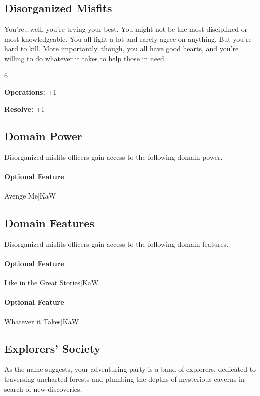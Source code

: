 \documentclass[10pt,a4paper,twoside,bg=print,twocolumn,openany,nodeprecatedcode]{dndbook}
\begin{document}
\subsection{Disorganized Misfits}
You're...well, you're trying your best. You might not be the most disciplined or most knowledgeable. You all fight a lot and rarely agree on anything. But you're hard to kill. More importantly, though, you all have good hearts, and you're willing to do whatever it takes to help those in need.

{\par \vspace { 9pt plus 3pt minus 3pt } \noindent  {} \nopagebreak }

\begin{itemize}
\begin{multicols}{6}
\item \textbf{Operations:} +1
\item \textbf{Resolve:} +1
\end{multicols}

\end{itemize}

\subsection{Domain Power}
Disorganized misfits officers gain access to the following domain power.

\paragraph{Optional Feature}
Avenge Me|KaW

\subsection{Domain Features}
Disorganized misfits officers gain access to the following domain features.

\paragraph{Optional Feature}
Like in the Great Stories|KaW

\paragraph{Optional Feature}
Whatever it Takes|KaW

\subsection{Explorers' Society}
As the name suggests, your adventuring party is a band of explorers, dedicated to traversing uncharted forests and plumbing the depths of mysterious caverns in search of new discoveries.
\end{document}
